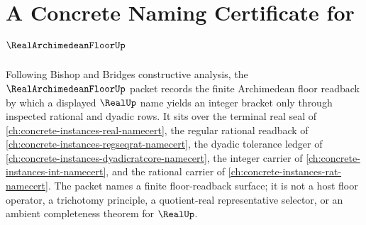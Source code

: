 \chapter{A Concrete Naming Certificate for $\RealArchimedeanFloorUp$}
\label{ch:concrete-instances-real-archimedean-floor-namecert}

Following Bishop and Bridges constructive analysis, the $\RealArchimedeanFloorUp$ packet records the finite Archimedean floor readback by which a displayed $\RealUp$ name yields an integer bracket only through inspected rational and dyadic rows. It sits over the terminal real seal of \autoref{ch:concrete-instances-real-namecert}, the regular rational readback of \autoref{ch:concrete-instances-regseqrat-namecert}, the dyadic tolerance ledger of \autoref{ch:concrete-instances-dyadicratcore-namecert}, the integer carrier of \autoref{ch:concrete-instances-int-namecert}, and the rational carrier of \autoref{ch:concrete-instances-rat-namecert}. The packet names a finite floor-readback surface; it is not a host floor operator, a trichotomy principle, a quotient-real representative selector, or an ambient completeness theorem for $\RealUp$.

